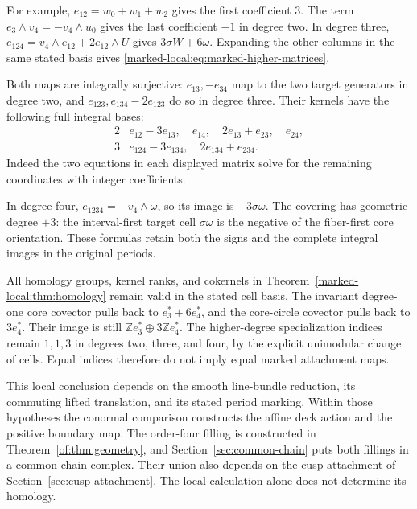 For example,
$e_{12}=w_0+w_1+w_2$ gives the first coefficient $3$.
The term $e_3\wedge v_4=-v_4\wedge u_0$ gives the last
coefficient $-1$ in degree two. In degree three,
$e_{124}=v_4\wedge e_{12}+2e_{12}\wedge U$
gives $3\sigma W+6\omega$. Expanding the other columns
in the same stated basis gives \eqref{marked-local:eq:marked-higher-matrices}.

Both maps are integrally surjective: $e_{13},-e_{34}$ map to
the two target generators in degree two, and
$e_{123},e_{134}-2e_{123}$ do so in degree three.
Their kernels have the following full integral bases:
\[
 \begin{array}{c|l}
 2&e_{12}-3e_{13},\quad e_{14},\quad 2e_{13}+e_{23},\quad e_{24},\\
 3&e_{124}-3e_{134},\quad 2e_{134}+e_{234}.
 \end{array}
\]
Indeed the two equations in each displayed matrix solve for the
remaining coordinates with integer coefficients.

In degree four,
$e_{1234}=-v_4\wedge\omega$, so its image is $-3\sigma\omega$.
The covering has geometric degree $+3$: the interval-first target
cell $\sigma\omega$ is the negative of the fiber-first core
orientation. These formulas retain both the signs and the complete
integral images in the original periods.

All homology groups, kernel ranks, and cokernels in
Theorem~\ref{marked-local:thm:homology} remain valid in the stated cell basis.
The invariant degree-one core covector pulls back to
$e_3^*+6e_4^*$, and the core-circle covector pulls back to
$3e_4^*$. Their image is still
$\mathbb Ze_3^*\oplus3\mathbb Ze_4^*$. The higher-degree
specialization indices remain $1,1,3$ in degrees two, three,
and four, by the explicit unimodular change of cells.
Equal indices therefore do not imply equal marked attachment maps.

This local conclusion depends on the smooth line-bundle reduction,
its commuting lifted translation, and its stated period marking.
Within those hypotheses the conormal comparison constructs the
affine deck action and the positive boundary map. The order-four
filling is constructed in Theorem~\ref{of:thm:geometry}, and
Section~\ref{sec:common-chain} puts both fillings in a common chain
complex. Their union also depends on the cusp attachment of
Section~\ref{sec:cusp-attachment}. The local calculation alone does
not determine its homology.

